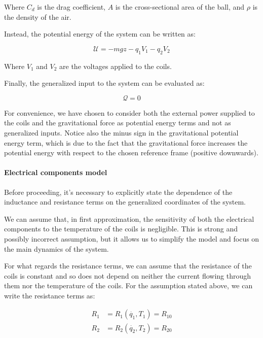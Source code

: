 Where $C_d$ is the drag coefficient, $A$ is the cross-sectional area of the ball, and $\rho$ is the density of the air.

Instead, the potential energy of the system can be written as:

\begin{equation}
    \mathcal{U} = -m g z - q_1 V_1 - q_2 V_2
    \label{eq:potential_energy}
\end{equation}

Where $V_1$ and $V_2$ are the voltages applied to the coils.

Finally, the generalized input to the system can be evaluated as:

\begin{equation}
    \mathcal{Q} = 0
    \label{eq:generalized_input}
\end{equation}

For convenience, we have chosen to consider both the external power supplied to the coils and the gravitational force as potential energy terms and not as generalized inputs.
Notice also the minus sign in the gravitational potential energy term, which is due to the fact that the gravitational force increases the potential energy with respect to the chosen reference frame (positive downwards).

\paragraph{Electrical components model}

Before proceeding, it's necessary to explicitly state the dependence of the inductance and resistance terms on the generalized coordinates of the system.

We can assume that, in first approximation, the sensitivity of both the electrical components to the temperature of the coils is negligible.
This is strong and possibly incorrect assumption, but it allows us to simplify the model and focus on the main dynamics of the system.

For what regards the resistance terms, we can assume that the resistance of the coils is constant and so does not depend on neither the current flowing through them nor the temperature of the coils.
For the assumption stated above, we can write the resistance terms as:

\begin{equation}
    \begin{aligned}
        R_1 & = R_1(\dot{q_1}, T_1) = R_{10} \\
        R_2 & = R_2(\dot{q_2}, T_2) = R_{20}
    \end{aligned}
    \label{eq:model_for_resistance}
\end{equation}

